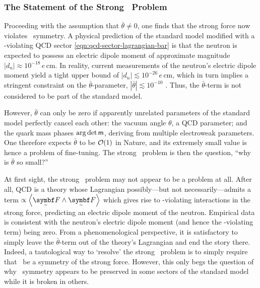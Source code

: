 \subsubsection{The Statement of the Strong \CP\ Problem}


Proceeding with the assumption that $\bar θ \ne 0$, one finds that the strong force now violates \CP\ symmetry.
A physical prediction of the standard model modified with a \CP-violating QCD sector \eqref{eqn:qcd-sector-lagrangian-bar} is that the neutron is expected to possess an electric dipole moment of approximate magnitude $|d_n| \approx 10^{-18} \,e\,\mathrm{cm}$.
In reality, current measurements \cite{electric_dipole_neutron_2020,lectures-on-scpp} of the neutron's electric dipole moment yield a tight upper bound of $|d_n| \lesssim 10^{-26} \,e\,\mathrm{cm}$, which in turn implies a stringent constraint on the $\bar θ$-parameter, $|\bar θ| \lesssim 10^{-10}$ \cite{ParticleDataGroup-review-2020}.
Thus, the $\bar θ$-term is not considered to be part of the standard model.

However, $\bar θ$ can only be zero if apparently unrelated parameters of the standard model perfectly cancel each other: the vacuum angle $θ$, a QCD parameter; and the quark mass phases $\arg\det\mat m$, deriving from multiple electroweak parameters.
One therefore expects $\bar θ$ to be $\cal O(1)$ in Nature, and its extremely small value is hence a problem of fine-tuning.
The strong \CP\ problem is then the question, ``why is $\bar θ$ so small?''




At first sight, the strong \CP\ problem may not appear to be a problem at all.
After all, QCD is a theory whose Lagrangian possibly---but not necessarily---admits a term $\propto \angbr{\tsbm F \wedge \tsbm F}$ which gives rise to \CP-violating interactions in the strong force, predicting an electric dipole moment of the neutron.
Empirical data is consistent with the neutron's electric dipole moment (and hence the \CP-violating term) being zero.
From a phenomenological perspective, it is satisfactory to simply leave the $\bar θ$-term out of the theory's Lagrangian and end the story there.
Indeed, a tautological way to `resolve' the strong \CP\ problem is to simply require that \CP\ be a symmetry of the strong force.
However, this only begs the question of why \CP\ symmetry appears to be preserved in some sectors of the standard model while it is broken in others.

